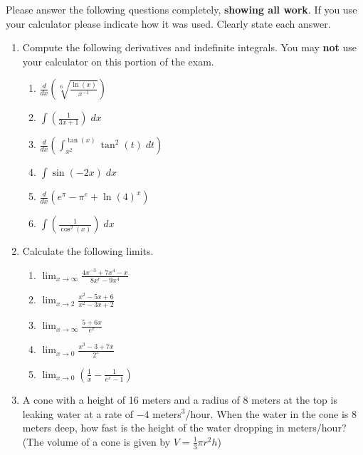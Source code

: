 \documentclass[11pt]{article}
\newcommand{\ds}{\displaystyle}
\begin{document}
\drawtitle

\noindent Please answer the following questions completely,
\textbf{showing all work}.  If you use your calculator please indicate
how it was used.  Clearly state each answer.

\begin{enumerate}
\item Compute the following derivatives and indefinite integrals.  You
  may \textbf{not} use your calculator on this portion of the exam.
  \begin{enumerate}
  \item $\ds\frac{d}{dx}\left(\sqrt[6]{\frac{\ln(x)}{x^{-1}}}\right)$
    \vfill
  \item $\ds\int\left(\frac{1}{3x+1}\right)\;dx$
    \vfill
    \newpage
  \item $\ds\frac{d}{dx}\left(\int_{x^2}^{\tan(x)}\tan^2(t)\;dt\right)$ \vfill
  \item $\ds\int\sin\left(-2x\right)\;dx$
    \vfill
    \newpage
  \item $\ds\frac{d}{dx}\left(e^{\pi}-\pi^e+\ln(4)^x\right)$
    \vfill
  \item $\ds\int\left(\frac{1}{\cos^2(x)}\right)\;dx$
    \vfill
  \end{enumerate}

  \newpage

\item Calculate the following limits.
  \begin{enumerate}
  \item $\ds\lim_{x\to \infty}\frac{4x^{-3}+7x^4-x}{8x^e-9x^4}$ \vfill
  \item $\ds\lim_{x\to 2}\frac{x^2-5x+6}{x^2-3x+2}$ \vfill
  \item $\ds\lim_{x\to \infty}\frac{5+6x}{e^x}$ \vfill\newpage
  \item $\ds\lim_{x\to 0}\frac{x^3-3+7x}{2^x}$ \vfill
  \item $\ds\lim_{x\to 0}\left(\frac{1}{x}-\frac{1}{e^x-1}\right)$ \vfill
  \end{enumerate}
  
  \newpage

\item A cone with a height of 16 meters and a radius of 8 meters at
  the top is leaking water at a rate of $-4$ meters$^3$/hour.  When
  the water in the cone is 8 meters deep, how fast is the height of
  the water dropping in meters/hour? (The volume of a cone is given by
  $V=\frac{1}{3}\pi r^2 h$)

  \newpage


\end{enumerate}
\end{document}
